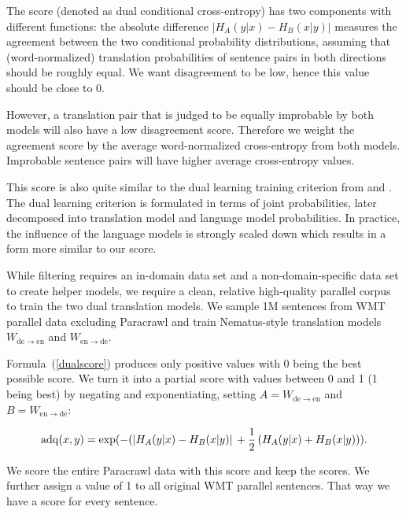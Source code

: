 \documentclass[11pt,a4paper]{article}
\begin{document}
The score (denoted as dual conditional cross-entropy) has two components with different functions: the absolute difference $\left| H_{A}(y|x) - H_{B}(x|y) \right|$ measures the agreement between the two conditional probability distributions, assuming that (word-normalized) translation probabilities of sentence pairs in both directions should be roughly equal. We want disagreement to be low, hence this value should be close to 0. 

However, a translation pair that is judged to be equally improbable by both models will also have a low disagreement score. Therefore we weight the agreement score by the average word-normalized cross-entropy from both models. Improbable sentence pairs will have higher average cross-entropy values. 

This score is also quite similar to the dual learning training criterion from  and . The dual learning criterion is formulated in terms of joint probabilities, later decomposed into translation model and language model probabilities. In practice, the influence of the language models is strongly scaled down which results in a form more similar to our score. 

While \citeauthor{moore-lewis:2010:Short} filtering requires an in-domain data set and a non-domain-specific data set to create helper models, we require a clean, relative high-quality parallel corpus to train the two dual translation models. We sample 1M sentences from WMT parallel data excluding Paracrawl and train Nematus-style translation models $W_{\mathrm{de}\rightarrow\mathrm{en}}$ and $W_{\mathrm{en}\rightarrow\mathrm{de}}$.

Formula~(\ref{dualscore}) produces only positive values with 0 being the best possible score. We turn it into a partial score with values between 0 and 1 (1 being best) by negating and exponentiating, setting 
$A = W_{\mathrm{de}\rightarrow\mathrm{en}}$ and
$B = W_{\mathrm{en}\rightarrow\mathrm{de}}$:

\begin{dmath*}
\mathrm{adq}(x,y) = \exp(-( \left| H_{A}(y|x) - H_{B}(x|y) \right|\\ 
   + \frac{1}{2} \left( H_{A}(y|x) + H_{B}(x|y) \right)).
\end{dmath*}

We score the entire Paracrawl data with this score and keep the scores. We further assign a value of 1 to all original WMT parallel sentences. That way we have a score for every sentence. 
\end{document}
